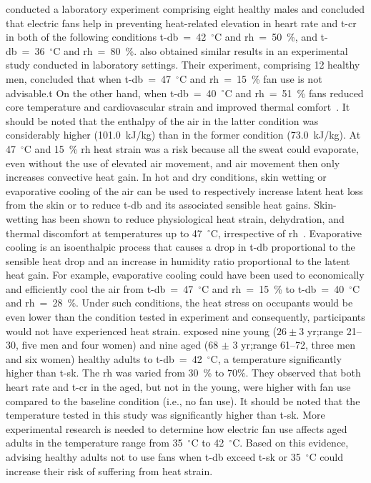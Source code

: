  conducted a laboratory experiment comprising eight healthy males and concluded that electric fans help in preventing heat-related elevation in heart rate and \ac{t-cr} in both of the following conditions \ac{t-db}~=~42~$^{\circ}$C and \ac{rh}~=~50~\%, and \ac{t-db}~=~36~$^{\circ}$C and \ac{rh}~=~80~\%.
 also obtained similar results in an experimental study conducted in laboratory settings.
Their experiment, comprising 12 healthy men, concluded that when \ac{t-db}~=~47~$^{\circ}$C and \ac{rh}~=~15~\% fan use is not advisable.t
On the other hand, when \ac{t-db}~=~40~$^{\circ}$C and \ac{rh}~=~51~\% fans reduced core temperature and cardiovascular strain and improved thermal comfort~\cite{Morris2019}.
It should be noted that the enthalpy of the air in the latter condition was considerably higher (101.0~kJ/kg) than in the former condition (73.0~kJ/kg).
At 47~$^{\circ}$C and 15~\% \ac{rh} heat strain was a risk because all the sweat could evaporate, even without the use of elevated air movement, and air movement then only increases convective heat gain.
In hot and dry conditions, skin wetting or evaporative cooling of the air can be used to respectively increase latent heat loss from the skin or to reduce \ac{t-db} and its associated sensible heat gains.
Skin-wetting has been shown to reduce physiological heat strain, dehydration, and thermal discomfort at temperatures up to 47~$^{\circ}$C, irrespective of \ac{rh}~\cite{Morris2019a}.
Evaporative cooling is an isoenthalpic process that causes a drop in \ac{t-db} proportional to the sensible heat drop and an increase in humidity ratio proportional to the latent heat gain.
For example, evaporative cooling could have been used to economically and efficiently cool the air from \ac{t-db}~=~47~$^{\circ}$C and \ac{rh}~=~15~\% to \ac{t-db}~=~40~$^{\circ}$C and \ac{rh}~=~28~\%\@.
Under such conditions, the heat stress on occupants would be even lower than the condition tested in  experiment and consequently, participants would not have experienced heat strain.
 exposed nine young ($26 \pm 3$ yr;\@ range 21--30, five men and four women) and nine aged (68 $\pm$ 3 yr;\@ range 61--72, three men and six women) healthy adults to \ac{t-db}~=~42~$^{\circ}$C, a temperature significantly higher than \ac{t-sk}.
The \ac{rh} was varied from 30~\% to 70\%.
They observed that both heart rate and \ac{t-cr} in the aged, but not in the young, were higher with fan use compared to the baseline condition (i.e., no fan use).
It should be noted that the temperature tested in this study was significantly higher than \ac{t-sk}.
More experimental research is needed to determine how electric fan use affects aged adults in the temperature range from 35~$^{\circ}$C to 42~$^{\circ}$C\@.
Based on this evidence, advising healthy adults not to use fans when \ac{t-db} exceed \ac{t-sk} or 35~$^{\circ}$C could increase their risk of suffering from heat strain.

